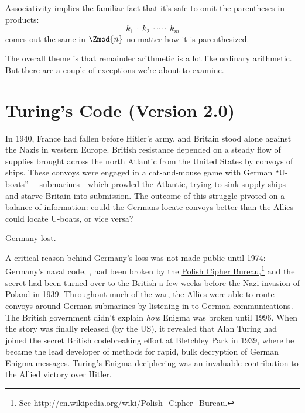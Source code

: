 Associativity implies the familiar fact that it's safe to omit the
parentheses in products:
\[
k_1\ \cdot\ k_2\ \cdot \cdots \cdot\ k_m
\]
comes out the same in $\Zmod{n}$ no matter how it is parenthesized.

The overall theme is that remainder arithmetic is a lot like ordinary
arithmetic.  But there are a couple of exceptions we're about to
examine.

\begin{problems}
\practiceproblems
{}

\homeworkproblems
{}

\classproblems
{}

\examproblems
{}

\end{problems}

\section{Turing's Code (Version 2.0)}

In 1940, France had fallen before Hitler's army, and Britain stood
alone against the Nazis in western Europe.  British resistance
depended on a steady flow of supplies brought across the north
Atlantic from the United States by convoys of ships.  These convoys
were engaged in a cat-and-mouse game with German ``U-boats''
---submarines---which prowled the Atlantic, trying to sink supply
ships and starve Britain into submission.  The outcome of this
struggle pivoted on a balance of information: could the Germans locate
convoys better than the Allies could locate U-boats, or vice versa?

Germany lost.

A critical reason behind Germany's loss was not made public until
1974: Germany's naval code, , had been broken by the
\href{http://en.wikipedia.org/wiki/Polish_Cipher_Bureau}{Polish Cipher
  Bureau},\footnote{See
  \href{http://en.wikipedia.org/wiki/Polish_Cipher_Bureau}
       {http://en.wikipedia.org/wiki/Polish\_Cipher\_Bureau.}}  and
the secret had been turned over to the British a few weeks before the
Nazi invasion of Poland in 1939.  Throughout much of the war, the
Allies were able to route convoys around German submarines by
listening in to German communications.  The British government didn't
explain \emph{how} Enigma was broken until 1996.  When the story was
finally released (by the US), it revealed that Alan Turing had joined
the secret British codebreaking effort at Bletchley Park in 1939,
where he became the lead developer of methods for rapid, bulk
decryption of German Enigma messages.  Turing's Enigma deciphering was
an invaluable contribution to the Allied victory over Hitler.


